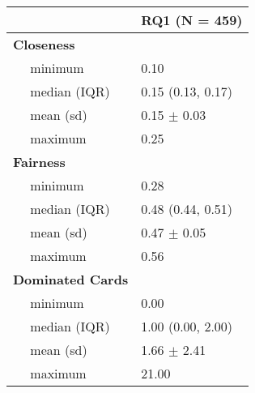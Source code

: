 
\begin{tabular}{l|l}
\hline
 & RQ1 (N = 459)\\
\hline
\bf{Closeness} & ~\\
\hline
~~ minimum & 0.10\\
\hline
~~ median (IQR) & 0.15 (0.13, 0.17)\\
\hline
~~ mean (sd) & 0.15 $\pm$ 0.03\\
\hline
~~ maximum & 0.25\\
\hline
\bf{Fairness} & ~\\
\hline
~~ minimum & 0.28\\
\hline
~~ median (IQR) & 0.48 (0.44, 0.51)\\
\hline
~~ mean (sd) & 0.47 $\pm$ 0.05\\
\hline
~~ maximum & 0.56\\
\hline
\bf{Dominated Cards} & ~\\
\hline
~~ minimum & 0.00\\
\hline
~~ median (IQR) & 1.00 (0.00, 2.00)\\
\hline
~~ mean (sd) & 1.66 $\pm$ 2.41\\
\hline
~~ maximum & 21.00\\
\hline
\end{tabular}
